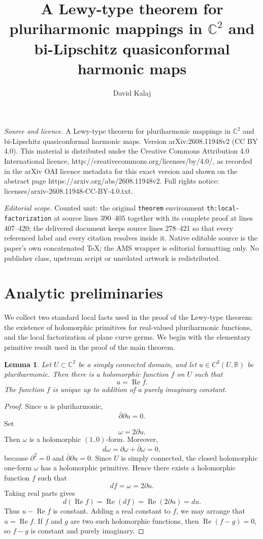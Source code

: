 \documentclass[10pt,a4paper]{amsart}
\newtheorem{lemma}[theorem]{Lemma}
\newcommand{\C}{\mathbb C}
\newcommand{\R}{\mathbb R}
\newcommand{\re}{\operatorname{Re}}
\begin{document}
\title[A Lewy-type theorem for pluriharmonic mappings in C^2 and bi]{A Lewy-type theorem for pluriharmonic mappings in $\C^2$ and bi-Lipschitz quasiconformal harmonic maps}
\author{David Kalaj}
\date{}
\maketitle
\noindent\emph{Source and licence.} A Lewy-type theorem for pluriharmonic mappings in $\C^2$ and bi-Lipschitz quasiconformal harmonic maps. Version arXiv:2608.11948v2 (CC BY 4.0). This material is distributed under the Creative Commons Attribution 4.0 International licence, http://creativecommons.org/licenses/by/4.0/, as recorded in the arXiv OAI licence metadata for this exact version and shown on the abstract page https://arxiv.org/abs/2608.11948v2. Full rights notice: licenses/arxiv-2608.11948-CC-BY-4.0.txt.\par\smallskip
\noindent\textit{Editorial scope.} Counted unit: the original \texttt{theorem} environment \texttt{th:local-factorization} at source lines 390--405 together with its complete proof at lines 407--420; the delivered document keeps source lines 278--421 so that every referenced label and every citation resolves inside it. Native editable source is the paper's own concatenated TeX; the AMS wrapper is editorial formatting only. No publisher class, upstream script or unrelated artwork is redistributed.
\section{Analytic preliminaries}

We collect two standard local facts used in the proof of the Lewy-type
theorem: the existence of holomorphic primitives for real-valued
pluriharmonic functions, and the local factorization of plane curve germs.
We begin with the elementary primitive result used in the proof of the main
theorem.

\begin{lemma}\label{lem:primitive}
Let $U\subset\C^2$ be a simply connected domain, and let
$u\in C^2(U,\R)$ be pluriharmonic. Then there is a holomorphic function
$f$ on $U$ such that
\[
        u=\re f.
\]
The function $f$ is unique up to addition of a purely imaginary
constant.
\end{lemma}

\begin{proof}
Since $u$ is pluriharmonic,
\[
        \bar\partial\partial u=0.
\]
Set
\[
        \omega=2\partial u.
\]
Then $\omega$ is a holomorphic $(1,0)$-form. Moreover,
\[
        d\omega=\partial\omega+\bar\partial\omega=0,
\]
because $\partial^2=0$ and $\bar\partial\partial u=0$. Since $U$ is
simply connected, the closed holomorphic one-form $\omega$ has a
holomorphic primitive. Hence there exists a holomorphic function $f$
such that
\[
        df=\omega=2\partial u.
\]
Taking real parts gives
\[
        d(\re f)=\re(df)=\re(2\partial u)=du.
\]
Thus $u-\re f$ is constant. Adding a real constant to $f$, we may
arrange that $u=\re f$. If $f$ and $g$ are two such holomorphic
functions, then $\re(f-g)=0$, so $f-g$ is constant and purely imaginary.
\end{proof}
\end{document}
